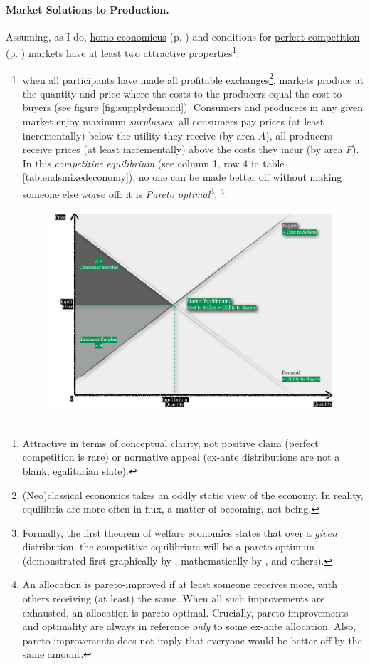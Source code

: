 \paragraph{Market Solutions to Production.}  \label{sec:marketsolutionsproduction} Assuming, as I do, \hyperref[it:homoeconomicus]{homo economicus} (p. \pageref{it:homoeconomicus})  and conditions for \hyperref[sec:perfectcompetition]{perfect competition} (p. \pageref{sec:perfectcompetition}) markets have at least two attractive properties\footnote
	{Attractive in terms of conceptual clarity, not positive claim (perfect competition is rare) or normative appeal (ex-ante distributions are not a blank, egalitarian slate).}:
\begin{enumerate}
	\item when all  participants have made all profitable exchanges\footnote
		{(Neo)classical economics takes an oddly static view of the economy. In reality, equilibria are more often in flux, a matter of becoming, not being.}, 
	markets produce at the quantity and price where the costs to the producers equal the cost to buyers (see figure \ref{fig:supplydemand}). Consumers and producers in any given market enjoy maximum \emph{surplusses}: all consumers pay prices (at least incrementally) below the utility they receive (by area $A$), all producers receive prices (at least incrementally) above the costs they incur (by area $F$). In this \emph{competitive equilibrium} (see column 1, row 4 in table \ref{tab:endsmixedeconomy}), no one can be made better off without making someone else worse off: it is \emph{Pareto optimal}\footnote{
		\label{fn:1sttheorem} Formally, the first theorem of welfare economics states that over a \emph{given} distribution, the competitive equilibrium will be a pareto optimum (demonstrated first graphically by \cite{Lerner1944}, mathematically by \cite{Lange1934}, \cite{Debreu1954} and others).},
		\footnote{An allocation is pareto-improved if at least someone receives more, with others receiving (at least) the same. When all such improvements are exhausted, an allocation is pareto optimal. Crucially, pareto improvements and optimality are always in reference \emph{only} to some ex-ante allocation. Also, pareto improvements does not imply that everyone would be better off by the same amount.}. 
	\begin{figure}[htbp]
		\centering
		\includegraphics[width=1\textwidth]{./img/supply-demand}  

\end{figure}
\end{enumerate}
